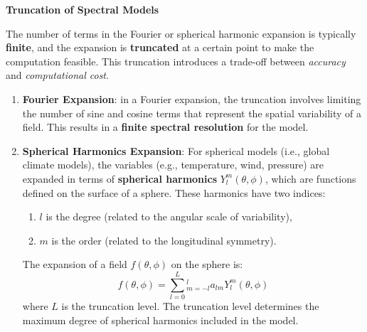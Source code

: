 \textbf{Truncation of Spectral Models}

The number of terms in the Fourier or spherical harmonic expansion is typically \textbf{finite}, and the expansion is \textbf{truncated} at a certain point to make the computation feasible. This truncation introduces a trade-off between \textit{accuracy} and \textit{computational cost}.

\begin{enumerate}
	\item \textbf{Fourier Expansion}: in a Fourier expansion, the truncation involves limiting the number of sine and cosine terms that represent the spatial variability of a field. This results in a \textbf{finite spectral resolution} for the model.
	\item \textbf{Spherical Harmonics Expansion}: For spherical models (i.e., global climate models), the variables (e.g., temperature, wind, pressure) are expanded in terms of \textbf{spherical harmonics} $Y_l^m(\theta,\phi)$, which are functions defined on the surface of a sphere. These harmonics have two indices:
	      \begin{enumerate}
		      \item  $l$ is the degree (related to the angular scale of variability),
		      \item $m$ is the order (related to the longitudinal symmetry).
	      \end{enumerate}
	      The expansion of a field $f(\theta,\phi)$ on the sphere is: $$f(\theta,\phi)=\displaystyle\sum_{l=0}^L\displaystyle_{m=-l}^la_{lm}Y_l^m(\theta,\phi)$$
	      where $L$ is the truncation level. The truncation level determines the maximum degree of spherical harmonics included in the model.
\end{enumerate}

